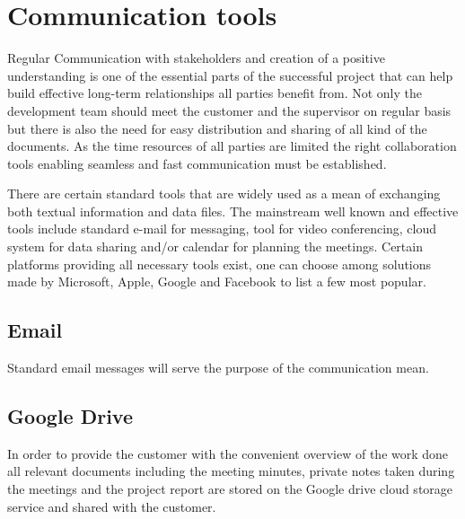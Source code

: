 
\section{Communication tools} \label{txt:communication tools}
Regular Communication with stakeholders and creation of a positive understanding is one of the essential parts of the successful project that can help build effective long-term relationships all parties benefit from. Not only the development team should meet the customer and the supervisor on regular basis but there is also the need for easy distribution and sharing of all kind of the documents. As the time resources of all parties are limited the right collaboration tools enabling seamless and fast communication must be established.

There are certain standard tools that are widely used as a mean of exchanging both textual information and data files. The mainstream well known and effective tools include standard e-mail for messaging, tool for video conferencing, cloud system for data sharing and/or calendar for planning the meetings. Certain platforms providing all necessary tools exist, one can choose among solutions made by Microsoft, Apple, Google and Facebook to list a few most popular.


\subsection{Email}
Standard email messages will serve the purpose of the communication mean.


\subsection{Google Drive}
In order to provide the customer with the convenient overview of the work done all relevant documents including the meeting minutes, private notes taken during the meetings and the project report are stored on the Google drive cloud storage service and shared with the customer.

